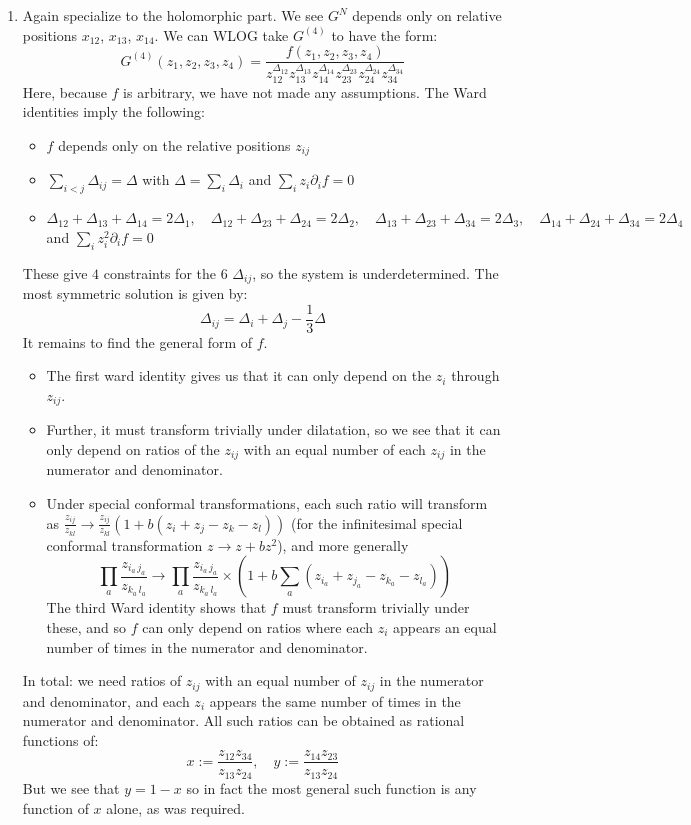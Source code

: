 \documentclass[11pt]{article}
\begin{document}
\begin{enumerate}
	\item Again specialize to the holomorphic part. We see $G^N$ depends only on relative positions $x_{12}$, $x_{13}$, $x_{14}$. We can WLOG take $G^{(4)}$ to have the form:
	\[
		G^{(4)}(z_1, z_2, z_3, z_4) = \frac{f(z_1, z_2, z_3, z_4)}{z_{12}^{\Delta_{12}} z_{13}^{\Delta_{13}} z_{14}^{\Delta_{14}} z_{23}^{\Delta_{23}} z_{24}^{\Delta_{24}} z_{34}^{\Delta_{34}}}
	\]
	Here, because $f$ is arbitrary, we have not made any assumptions. The Ward identities imply the following:
	\begin{itemize}
		\item $f$ depends only on the relative positions $z_{ij}$
		\item $\sum_{i<j} \Delta_{ij} = \Delta$ with $\Delta = \sum_{i} \Delta_i$ and $\sum_i z_i \partial_i f = 0$
		\item $\Delta_{12} + \Delta_{13} + \Delta_{14} = 2 \Delta_1,\quad  \Delta_{12} + \Delta_{23} + \Delta_{24} = 2 \Delta_2, \quad \Delta_{13} + \Delta_{23} + \Delta_{34} = 2 \Delta_3, \quad \Delta_{14} + \Delta_{24} + \Delta_{34} = 2 \Delta_4$ and $\sum_i z_i^2 \partial_i f = 0$
	\end{itemize}
	These give $4$ constraints for the $6$ $\Delta_{ij}$, so the system is underdetermined. The most symmetric solution is given by:
	\[
		\Delta_{ij} = \Delta_i + \Delta_j - \frac13 \Delta
	\]
	It remains to find the general form of $f$.
	\begin{itemize}
		\item The first ward identity gives us that it can only depend on the $z_i$ through $z_{ij}$.
		\item Further, it must transform trivially under dilatation, so we see that it can only depend on ratios of the $z_{ij}$ with an equal number of each $z_{ij}$ in the numerator and denominator. 
		\item Under special conformal transformations, each such ratio will transform as $\frac{z_{ij}}{z_{kl}} \to \frac{z_{ij}}{z_{kl}} \left(1 + b (z_i + z_j - z_k - z_l)\right)$ (for the infinitesimal special conformal transformation $z \to z + b z^2$), and more generally
		\[
			\prod_a \frac{z_{i_a \, j_a}}{z_{k_a\, l_a}} \to \prod_a \frac{z_{i_a \, j_a}}{z_{k_a\, l_a}} \times \left(1 + b \sum_{a} (z_{i_a} + z_{j_a} - z_{k_a} - z_{l_a})\right)
		\]
		 The third Ward identity shows that $f$ must transform trivially under these, and so $f$ can only depend on ratios where each $z_i$ appears an equal number of times in the numerator and denominator. 
	\end{itemize}
	In total: we need ratios of $z_{ij}$ with an equal number of $z_{ij}$ in the numerator and denominator, and each $z_i$ appears the same number of times in the numerator and denominator. All such ratios can be obtained as rational functions of:
	\[
		x := \frac{z_{12} z_{34}}{z_{13} z_{24}}, \quad y := \frac{z_{14} z_{23}}{z_{13} z_{24}}
	\]
	But we see that $y = 1-x$ so in fact the most general such function is any function of $x$ alone, as was required. 
	

\end{enumerate}
\end{document}
